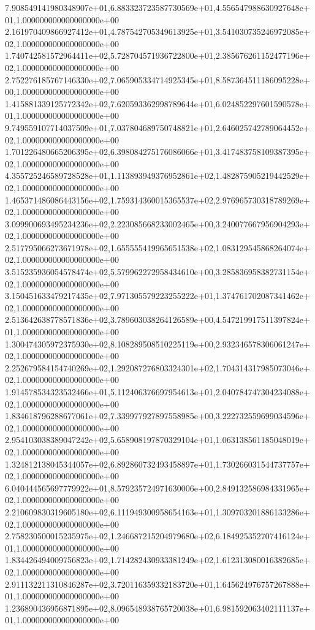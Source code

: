 7.908549141980348907e+01,6.883323723587730569e+01,4.556547988630927648e+01,1.000000000000000000e+00
2.161970409866927412e+01,4.787542705349613925e+01,3.541030735246972085e+02,1.000000000000000000e+00
1.740742581572964411e+02,5.728704571936722800e+01,2.385676261152477196e+02,1.000000000000000000e+00
2.752276185767146330e+02,7.065905334714925345e+01,8.587364511186095228e+00,1.000000000000000000e+00
1.415881339125772342e+02,7.620593362998789644e+01,6.024852297601590578e+01,1.000000000000000000e+00
9.749559107714037509e+01,7.037804689750748821e+01,2.646025742789064452e+02,1.000000000000000000e+00
1.701226480665206395e+02,6.398084275176086066e+01,3.417483758109387395e+02,1.000000000000000000e+00
4.355725246589728528e+01,1.113893949376952861e+02,1.482875905219442529e+02,1.000000000000000000e+00
1.465371486086443156e+02,1.759314360015365537e+02,2.976965730318789269e+02,1.000000000000000000e+00
3.099900693495234236e+02,2.223085668233002465e+00,3.240077667956904293e+02,1.000000000000000000e+00
2.517795066273671978e+02,1.655555419965651538e+02,1.083129545868264074e+02,1.000000000000000000e+00
3.515235936054578474e+02,5.579962272958434610e+00,3.285836958382731154e+02,1.000000000000000000e+00
3.150451633479217435e+02,7.971305579223255222e+01,1.374761702087341462e+02,1.000000000000000000e+00
2.513642638778571836e+02,3.789603038264126589e+00,4.547219917511397824e+01,1.000000000000000000e+00
1.300474305972375930e+02,8.108289508510225119e+00,2.932346578306061247e+02,1.000000000000000000e+00
2.252679584154740269e+02,1.292087276803324301e+02,1.704314317985073046e+02,1.000000000000000000e+00
1.914578534323532466e+01,5.112406376697954613e+01,2.040784747304234088e+02,1.000000000000000000e+00
1.834618796288677061e+02,7.339977927897558985e+00,3.222732559699034596e+02,1.000000000000000000e+00
2.954103038389047242e+02,5.658908197870329104e+01,1.063138561185048019e+02,1.000000000000000000e+00
1.324812138045344057e+02,6.892860732493458897e+01,1.730266031544737757e+02,1.000000000000000000e+00
6.040444565697779922e+01,8.579235724971630006e+00,2.849132586984331965e+02,1.000000000000000000e+00
2.210609830319605180e+02,6.111949300958654163e+01,1.309703201886133286e+02,1.000000000000000000e+00
2.758230500015235975e+02,1.246687215204979680e+02,6.184925352707416124e+01,1.000000000000000000e+00
1.834426494009756823e+02,1.714282430933381249e+02,1.612313080016382685e+02,1.000000000000000000e+00
2.911132211310846287e+02,3.720116359332183720e+01,1.645624976757267888e+01,1.000000000000000000e+00
1.236890436956871895e+02,8.096548938765720038e+01,6.981592063402111137e+01,1.000000000000000000e+00
